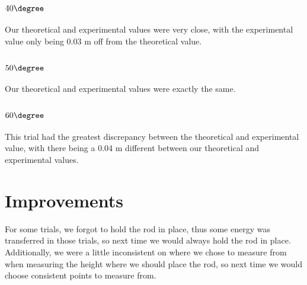 \documentclass{article}
\begin{document}
\subsection{$40\degree$}
Our theoretical and experimental values were very close, with the experimental value only being 0.03 m off from the theoretical value.
\subsection{$50\degree$}
Our theoretical and experimental values were exactly the same.
\subsection{$60\degree$}
This trial had the greatest discrepancy between the theoretical and experimental value, with there being a 0.04 m different between our theoretical and experimental values.
\section{Improvements}
For some trials, we forgot to hold the rod in place, thus some energy was transferred in those trials, so next time we would always hold the rod in place. Additionally, we were a little inconsistent on where we chose to measure from when measuring the height where we should place the rod, so next time we would choose consistent points to measure from.
\end{document}
